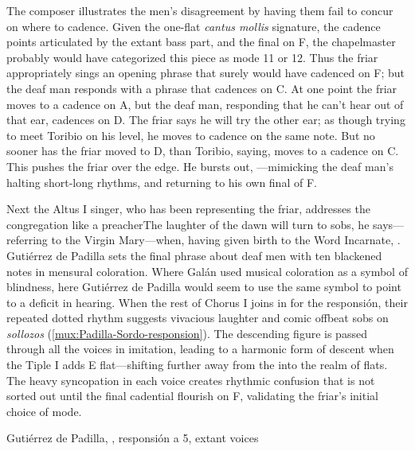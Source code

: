 The composer illustrates the men's disagreement by having them fail to concur on
where to cadence.
Given the one-flat \emph{cantus mollis} signature, the cadence points
articulated by the extant bass part, and the final on F, the chapelmaster
probably would have categorized this piece as mode 11 or 12.%
    \Autocites
    [873--882]{Cerone:Melopeo} 
    {Judd:RenaissanceModalTheory}{Barnett:TonalOrganization17C}  
Thus the friar appropriately sings an opening phrase that surely would have
cadenced on F; but the deaf man responds with a phrase that cadences on C.
At one point the friar moves to a cadence on A, but the deaf man, responding
that he can't hear out of that ear, cadences on D. 
The friar says he will try the other ear; as though trying to meet Toribio on
his level, he moves to cadence on the same note.
But no sooner has the friar moved to D, than Toribio, saying,  moves to a cadence on C.  
This pushes the friar over the edge.
He bursts out, ---mimicking the deaf man's
halting short-long rhythms, and returning to his own final of F.

Next the Altus I singer, who has been representing the friar, addresses the
congregation like a preacher{The laughter of the dawn will turn to
sobs}, he says---referring to the Virgin Mary---when, having given birth to the
Word Incarnate, .  
Gutiérrez de Padilla sets the final phrase about deaf men with ten blackened
notes in mensural coloration.
Where Galán used musical coloration as a symbol of blindness, here Gutiérrez de
Padilla would seem to use the same symbol to point to a deficit in hearing.
When the rest of Chorus I joins in for the responsión, their repeated dotted
rhythm suggests vivacious laughter and comic offbeat sobs on \emph{sollozos}
(\cref{mux:Padilla-Sordo-responsion}).
The descending figure is passed through all the voices in imitation, leading to
a harmonic form of descent when the Tiple I adds E flat---shifting further away
from the  into the  realm of flats.
The heavy syncopation in each voice creates rhythmic confusion that is not
sorted out until the final cadential flourish on F, validating the friar's
initial choice of mode.

{Gutiérrez de Padilla, , responsión a 5,
extant voices}

